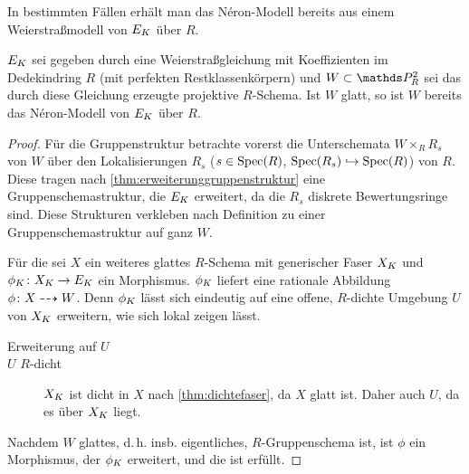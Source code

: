 \documentclass[german]{scrreprt}
\begin{document}
In bestimmten Fällen erhält man das Néron-Modell bereits aus einem
Weierstraßmodell von $E_{K}$ über $R$.
\begin{Korollar}\label{thm:neronmausweierstrassgl}
  $E_{K}$ sei gegeben durch eine Weierstraßgleichung mit
  Koeffizienten im Dedekindring $R$ (mit perfekten Restklassenkörpern)
  und $W\subset\P_R^2$ sei das durch diese Gleichung erzeugte projektive
  $R$-Schema.
  Ist $W$ glatt, so ist $W$ bereits das Néron-Modell von $E_{K}$ über
  $R$.
  \cite[Corollary IV.6.3]{silverman2}
  \begin{proof}
    Für die Gruppenstruktur betrachte vorerst die Unterschemata
    $W\times_R R_s$ von $W$ über den Lokalisierungen
    $R_s$ ($s\in\operatorname{Spec}(R)$, $\operatorname{Spec}(R_s)\hookrightarrow\operatorname{Spec}(R)$) von $R$.
    Diese tragen nach \autoref{thm:erweiterunggruppenstruktur} eine
    Gruppenschemastruktur, die $E_{K}$ erweitert, da die $R_s$ diskrete
    Bewertungsringe sind.
    Diese Strukturen verkleben nach Definition zu einer
    Gruppenschemastruktur auf ganz $W$.

    Für die \NAbbEig sei $X$ ein weiteres glattes $R$-Schema mit
    generischer Faser $X_{K}$ und $\phi_{K}\colon X_{K}\to E_{K}$ ein
    Morphismus.
    $\phi_{K}$ liefert eine rationale Abbildung $\phi\colon X\dashrightarrow W$.
    Denn $\phi_{K}$ lässt sich eindeutig auf eine offene, $R$-dichte
    Umgebung $U$ von $X_{K}$ erweitern, wie sich lokal zeigen lässt.
    \begin{description}
    \item[Erweiterung auf $U$]

      
    \item[$U$ $R$-dicht]
      $X_{K}$ ist dicht in $X$ nach \autoref{thm:dichtefaser}, da $X$
      glatt ist.
      Daher auch $U$, da es über $X_{K}$ liegt.  
    \end{description}
    
    Nachdem $W$ glattes, d.\,h. insb. eigentliches, $R$-Gruppenschema
    ist, ist $\phi$ ein Morphismus, der $\phi_{K}$ erweitert, und die
    \NAbbEig ist erfüllt.
  \end{proof}
\end{Korollar}
\end{document}
